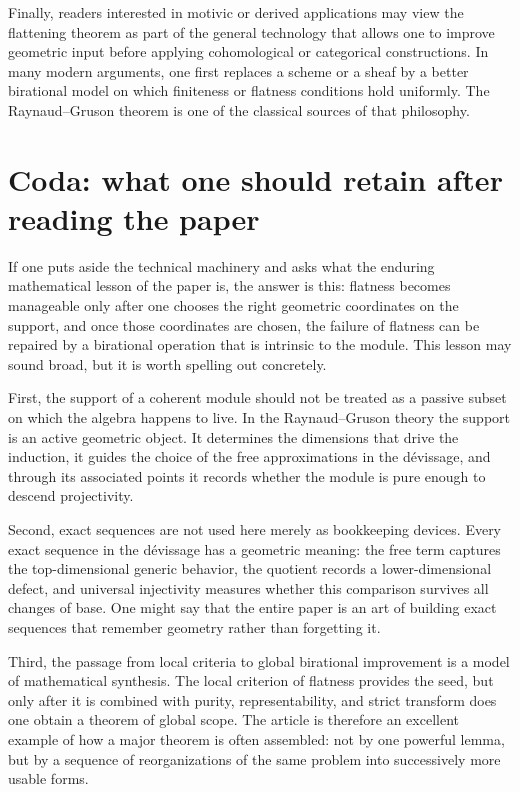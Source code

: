 \documentclass[11pt,oneside]{article}
\begin{document}
Finally, readers interested in motivic or derived applications may view the flattening theorem as part of the general technology that allows one to improve geometric input before applying cohomological or categorical constructions.  In many modern arguments, one first replaces a scheme or a sheaf by a better birational model on which finiteness or flatness conditions hold uniformly.  The Raynaud--Gruson theorem is one of the classical sources of that philosophy.




\section{Coda: what one should retain after reading the paper}

If one puts aside the technical machinery and asks what the enduring mathematical lesson of the paper is, the answer is this: flatness becomes manageable only after one chooses the right geometric coordinates on the support, and once those coordinates are chosen, the failure of flatness can be repaired by a birational operation that is intrinsic to the module.  This lesson may sound broad, but it is worth spelling out concretely.

First, the support of a coherent module should not be treated as a passive subset on which the algebra happens to live.  In the Raynaud--Gruson theory the support is an active geometric object.  It determines the dimensions that drive the induction, it guides the choice of the free approximations in the d\'evissage, and through its associated points it records whether the module is pure enough to descend projectivity.

Second, exact sequences are not used here merely as bookkeeping devices.  Every exact sequence in the d\'evissage has a geometric meaning: the free term captures the top-dimensional generic behavior, the quotient records a lower-dimensional defect, and universal injectivity measures whether this comparison survives all changes of base.  One might say that the entire paper is an art of building exact sequences that remember geometry rather than forgetting it.

Third, the passage from local criteria to global birational improvement is a model of mathematical synthesis.  The local criterion of flatness provides the seed, but only after it is combined with purity, representability, and strict transform does one obtain a theorem of global scope.  The article is therefore an excellent example of how a major theorem is often assembled: not by one powerful lemma, but by a sequence of reorganizations of the same problem into successively more usable forms.
\end{document}
